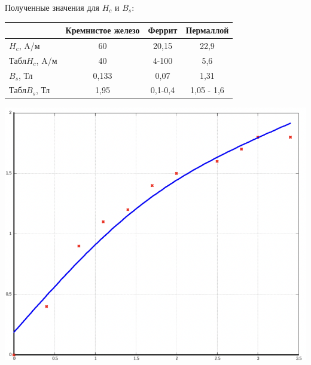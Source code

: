 \documentclass[11pt]{article}
\begin{document}
\begin{enumerate}
Полученные значения для $H_c$ и $B_s$:

\begin{table}[h]
\centering
\begin{tabular}{|l|c|c|c|}
\hline
           & \multicolumn{1}{l|}{Кремнистое железо} & \multicolumn{1}{l|}{Феррит} & \multicolumn{1}{l|}{Пермаллой} \\ \hline
$H_c$, A/м & 
60                                  & 20,15                        & 22,9                           \\ \hline
$Табл H_c$, A/м & 
40                                  & 4-100                        & 5,6                           \\ \hline
$B_s$, Тл  & 
0,133                                   & 0,07                        & 
1,31                          \\ \hline
$Табл B_s$, Тл  & 1,95                                   & 0,1-0,4                        & 1,05 - 1,6                          \\ \hline
\end{tabular}
\end{table}



\begin{center}
\includegraphics[scale=1]{graf1.png}
\end{center}


\end{enumerate}
\end{document}
